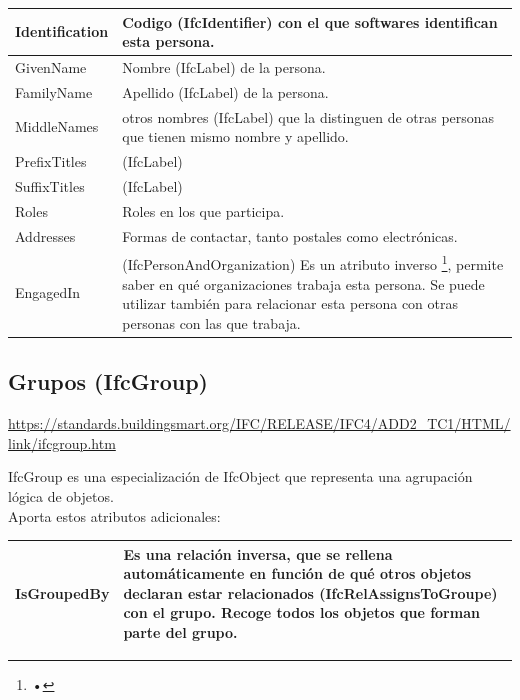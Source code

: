 \documentclass[spanish,12pt,a4paper,final,oneside]{book}
\begin{document}
\begin{itemize}
\begin{longtable}{|p{2.5cm} p{11cm}|}
Identification & Codigo (IfcIdentifier) con el que softwares identifican esta persona.
\\[0.1cm] \hline

GivenName & Nombre (IfcLabel) de la persona.
\\[0.1cm] \hline

FamilyName & Apellido (IfcLabel) de la persona.
\\[0.1cm] \hline

MiddleNames & otros nombres (IfcLabel) que la distinguen de otras personas que tienen mismo nombre y apellido.
\\[0.1cm] \hline

PrefixTitles & (IfcLabel)
\\[0.1cm] \hline

SuffixTitles & (IfcLabel)
\\[0.1cm] \hline

Roles & Roles en los que participa.
\\[0.1cm] \hline

Addresses & Formas de contactar, tanto postales como electrónicas.
\\[0.1cm] \hline

EngagedIn & (IfcPersonAndOrganization) Es un atributo inverso \footnote{•}, permite saber en qué organizaciones trabaja esta persona. Se puede utilizar también para relacionar esta persona con otras personas con las que trabaja.
\\[0.1cm] \hline

\end{longtable}

\end{itemize}



\subsection{Grupos (IfcGroup)}
\url{https://standards.buildingsmart.org/IFC/RELEASE/IFC4/ADD2_TC1/HTML/link/ifcgroup.htm}

IfcGroup es una especialización de IfcObject que representa una agrupación lógica de objetos.
\\Aporta estos atributos adicionales:

\begin{longtable}{|p{2.5cm} p{11cm}|}
\hline
IsGroupedBy & Es una relación inversa, que se rellena automáticamente en función de qué otros objetos declaran estar relacionados (IfcRelAssignsToGroupe) con el grupo. Recoge todos los objetos que forman parte del grupo.
\\[0.1cm] \hline
\end{longtable}
\end{document}
